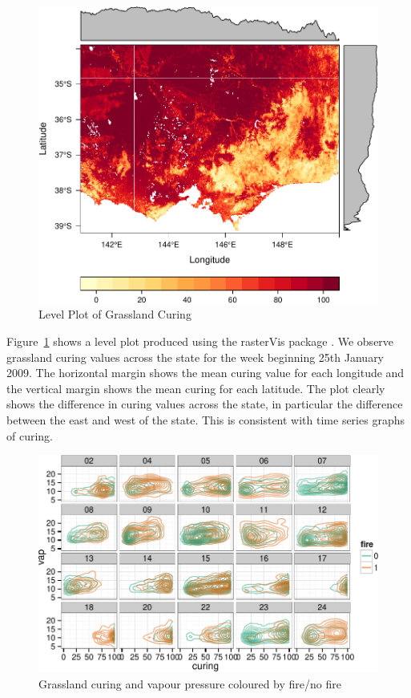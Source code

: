 \documentclass[11pt,a4paper]{article}
\begin{document}
\begin{figure}
  \centering
	\includegraphics[width=.8\textwidth]{figures/cur_lp.pdf}
  \caption{Level Plot of Grassland Curing }
  \label{fig:cur_lp}
\end{figure}


Figure~\ref{fig:cur_lp} shows a level plot produced using the rasterVis package \citep{rastervis}. We observe grassland curing values across the state for the week beginning 25th January 2009. The horizontal margin shows the mean curing value for each longitude and the vertical margin shows the mean curing for each latitude. The plot clearly shows the difference in curing values across the state, in particular the difference between the east and west of the state. This is consistent with time series graphs of curing.

\begin{figure}
  \centering
  \includegraphics[width=\textwidth]{figures/gv_fire.pdf}
  \caption{Grassland curing and vapour pressure coloured by fire/no fire}
  \label{fig:gv_fire}
\end{figure}
\end{document}
